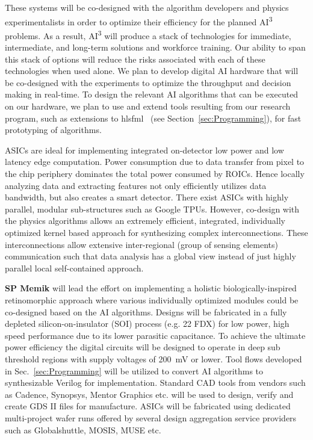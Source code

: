 These systems will be co-designed with the algorithm developers and physics experimentalists in order to optimize their efficiency for the planned AI\textsuperscript{3} problems. As a result, AI\textsuperscript{3} will produce a stack of technologies for immediate, intermediate, and long-term solutions and workforce training. Our ability to span this stack of options will reduce the risks associated with each of these technologies when used alone. We plan to develop digital AI hardware that will be co-designed with the experiments to optimize the throughput and decision making in real-time.  To design the relevant AI algorithms that can be executed on our hardware, we plan to use and extend tools resulting from our research program, such as extensions to hlsfml~\cite{Duarte:2018ite} (see Section~\ref{sec:Programming}), for fast prototyping of algorithms. 





ASICs are ideal for implementing integrated  on-detector low power and low latency edge computation. Power consumption due to data transfer from pixel to the chip periphery
dominates the total power consumed by ROICs. Hence locally analyzing data and extracting features not only efficiently utilizes data bandwidth, but also creates a smart detector.  There exist ASICs with highly parallel, modular sub-structures such as Google TPUs. However, co-design with the physics algorithms allows an extremely efficient, integrated, individually optimized kernel based approach for synthesizing complex interconnections. These interconnections allow extensive inter-regional (group of sensing elements) communication such that data analysis has a global view instead of just highly parallel local self-contained approach. 



\textbf{SP Memik} will lead the effort on implementing a holistic biologically-inspired retinomorphic approach where various individually optimized modules could be co-designed based on the AI algorithms. Designs will be fabricated in a fully depleted silicon-on-insulator (SOI) process (e.g. 22 FDX) for low power, high speed performance due to its lower parasitic capacitance. To achieve the ultimate power efficiency the digital circuits will be designed to operate in deep sub threshold regions with supply voltages of 200~mV or lower. Tool flows developed in Sec.~\ref{sec:Programming} will be utilized to convert AI algorithms to synthesizable Verilog for implementation. Standard CAD tools from vendors such as Cadence, Synopsys, Mentor Graphics etc. will be used to design, verify and create GDS II files for manufacture.  ASICs will be fabricated using dedicated multi-project wafer runs offered by several design aggregation service providers such as Globalshuttle, MOSIS, MUSE etc.





